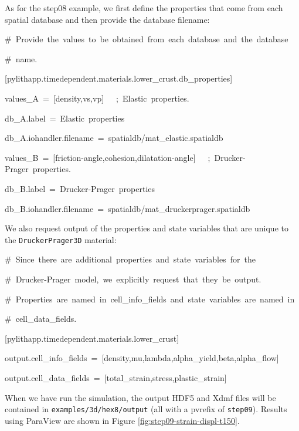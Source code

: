 As for the step08 example, we first define the properties that come
from each spatial database and then provide the database filename:
\begin{lyxcode}
\#~Provide~the~values~to~be~obtained~from~each~database~and~the~database

\#~name.

{[}pylithapp.timedependent.materials.lower\_crust.db\_properties{]}

values\_A~=~{[}density,vs,vp{]}~~~;~Elastic~properties.

db\_A.label~=~Elastic~properties

db\_A.iohandler.filename~=~spatialdb/mat\_elastic.spatialdb

values\_B~=~{[}friction-angle,cohesion,dilatation-angle{]}~~~;~Drucker-Prager~properties.

db\_B.label~=~Drucker-Prager~properties

db\_B.iohandler.filename~=~spatialdb/mat\_druckerprager.spatialdb
\end{lyxcode}
We also request output of the properties and state variables that
are unique to the \texttt{DruckerPrager3D} material:
\begin{lyxcode}
\#~Since~there~are~additional~properties~and~state~variables~for~the

\#~Drucker-Prager~model,~we~explicitly~request~that~they~be~output.

\#~Properties~are~named~in~cell\_info\_fields~and~state~variables~are~named~in

\#~cell\_data\_fields.

{[}pylithapp.timedependent.materials.lower\_crust{]}

output.cell\_info\_fields~=~{[}density,mu,lambda,alpha\_yield,beta,alpha\_flow{]}

output.cell\_data\_fields~=~{[}total\_strain,stress,plastic\_strain{]}
\end{lyxcode}
When we have run the simulation, the output HDF5 and Xdmf files will
be contained in \texttt{examples/3d/hex8/output} (all with a pvrefix
of \texttt{step09}). Results using ParaView are shown in Figure \vref{fig:step09-strain-displ-t150}.

